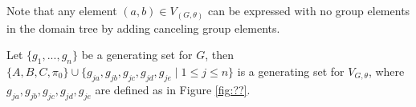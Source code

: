 \documentclass[11pt]{amsart}
\theoremstyle{plain}
\theoremstyle{remark}
\theoremstyle{definition}
\theoremstyle{remark}
\theoremstyle{named}
\begin{document}
\begin{figure}[h]
\end{figure}

Note that any element $(a,b) \in V_{(G,\theta)}$ can be expressed with no group elements in the domain tree by adding canceling group elements.

Let $\{g_1, ... , g_n\}$ be a generating set for $G$, then $\{A,B,C,\pi_0\} \cup \{g_{ja}, g_{jb}, g_{jc}, g_{jd}, g_{je} \mid 1 \le j \le n\}$ is a generating set for $V_{G,\theta}$, where $ g_{ja}, g_{jb}, g_{jc}, g_{jd}, g_{je}$ are defined as in Figure \ref{fig:??}.

\begin{figure}[h]
\end{figure}
\end{document}
